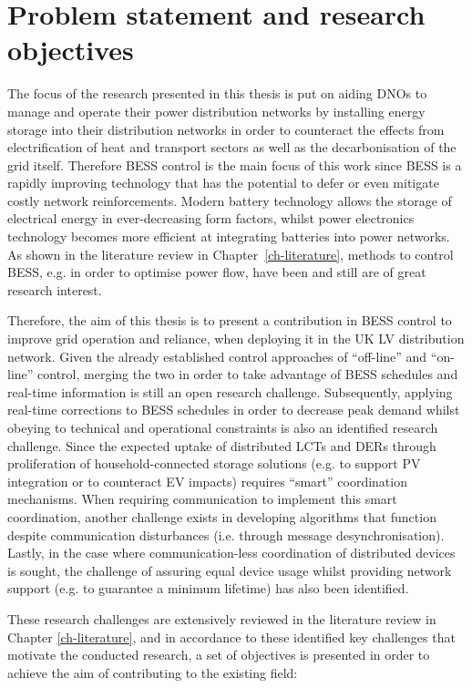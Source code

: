 \section{Problem statement and research objectives}
\label{ch-introduction:sec:problem-statement}

The focus of the research presented in this thesis is put on aiding DNOs to manage and operate their power distribution networks by installing energy storage into their distribution networks in order to counteract the effects from electrification of heat and transport sectors as well as the decarbonisation of the grid itself.
Therefore BESS control is the main focus of this work since BESS is a rapidly improving technology that has the potential to defer or even mitigate costly network reinforcements.
Modern battery technology allows the storage of electrical energy in ever-decreasing form factors, whilst power electronics technology becomes more efficient at integrating batteries into power networks.
As shown in the literature review in Chapter~\ref{ch-literature}, methods to control BESS, e.g. in order to optimise power flow, have been and still are of great research interest.

Therefore, the aim of this thesis is to present a contribution in BESS control to improve grid operation and reliance, when deploying it in the UK LV distribution network.
Given the already established control approaches of ``off-line'' and ``on-line'' control, merging the two in order to take advantage of BESS schedules and real-time information is still an open research challenge.
Subsequently, applying real-time corrections to BESS schedules in order to decrease peak demand whilst obeying to technical and operational constraints is also an identified research challenge.
Since the expected uptake of distributed LCTs and DERs through proliferation of household-connected storage solutions (e.g. to support PV integration or to counteract EV impacts) requires ``smart'' coordination mechanisms.
When requiring communication to implement this smart coordination, another challenge exists in developing algorithms that function despite communication disturbances (i.e. through message desynchronisation).
Lastly, in the case where communication-less coordination of distributed devices is sought, the challenge of assuring equal device usage whilst providing network support (e.g. to guarantee a minimum lifetime) has also been identified.

These research challenges are extensively reviewed in the literature review in Chapter \ref{ch-literature}, and in accordance to these identified key challenges that motivate the conducted research, a set of objectives is presented in order to achieve the aim of contributing to the existing field:


